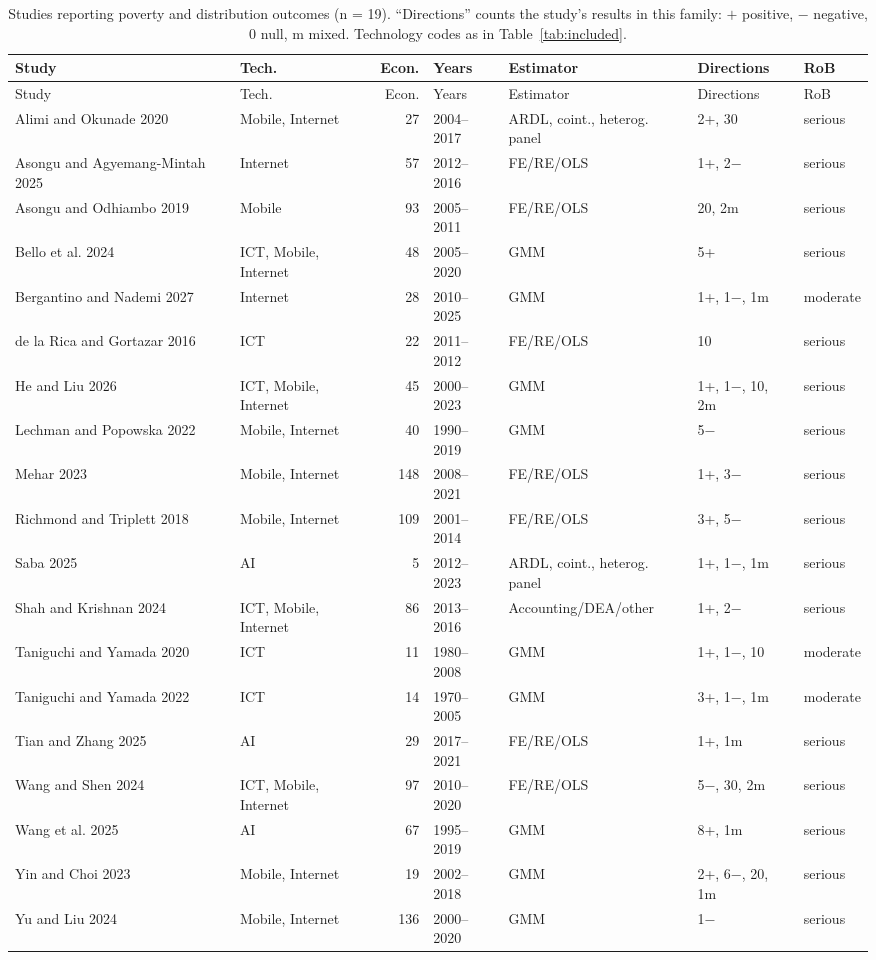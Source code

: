 {\scriptsize\setlength{\tabcolsep}{3pt}
\begin{longtable}{@{}p{3.1cm} p{1.9cm} r l p{2.4cm} p{2.3cm} l@{}}
\caption{Studies reporting poverty and distribution outcomes (n = 19). ``Directions'' counts the study's results in this family: $+$ positive, $-$ negative, 0 null, m mixed. Technology codes as in Table~\ref{tab:included}.}\label{tab:fam4}\\
\toprule Study & Tech. & Econ. & Years & Estimator & Directions & RoB \\ \midrule \endfirsthead
\toprule Study & Tech. & Econ. & Years & Estimator & Directions & RoB \\ \midrule \endhead
\bottomrule \endfoot
Alimi and Okunade 2020 & Mobile, Internet & 27 & 2004--2017 & ARDL, coint., heterog. panel & 2+, 30 & serious \\
Asongu and Agyemang-Mintah 2025 & Internet & 57 & 2012--2016 & FE/RE/OLS & 1+, 2$-$ & serious \\
Asongu and Odhiambo 2019 & Mobile & 93 & 2005--2011 & FE/RE/OLS & 20, 2m & serious \\
Bello et al. 2024 & ICT, Mobile, Internet & 48 & 2005--2020 & GMM & 5+ & serious \\
Bergantino and Nademi 2027 & Internet & 28 & 2010--2025 & GMM & 1+, 1$-$, 1m & moderate \\
de la Rica and Gortazar 2016 & ICT & 22 & 2011--2012 & FE/RE/OLS & 10 & serious \\
He and Liu 2026 & ICT, Mobile, Internet & 45 & 2000--2023 & GMM & 1+, 1$-$, 10, 2m & serious \\
Lechman and Popowska 2022 & Mobile, Internet & 40 & 1990--2019 & GMM & 5$-$ & serious \\
Mehar 2023 & Mobile, Internet & 148 & 2008--2021 & FE/RE/OLS & 1+, 3$-$ & serious \\
Richmond and Triplett 2018 & Mobile, Internet & 109 & 2001--2014 & FE/RE/OLS & 3+, 5$-$ & serious \\
Saba 2025 & AI & 5 & 2012--2023 & ARDL, coint., heterog. panel & 1+, 1$-$, 1m & serious \\
Shah and Krishnan 2024 & ICT, Mobile, Internet & 86 & 2013--2016 & Accounting/DEA/other & 1+, 2$-$ & serious \\
Taniguchi and Yamada 2020 & ICT & 11 & 1980--2008 & GMM & 1+, 1$-$, 10 & moderate \\
Taniguchi and Yamada 2022 & ICT & 14 & 1970--2005 & GMM & 3+, 1$-$, 1m & moderate \\
Tian and Zhang 2025 & AI & 29 & 2017--2021 & FE/RE/OLS & 1+, 1m & serious \\
Wang and Shen 2024 & ICT, Mobile, Internet & 97 & 2010--2020 & FE/RE/OLS & 5$-$, 30, 2m & serious \\
Wang et al. 2025 & AI & 67 & 1995--2019 & GMM & 8+, 1m & serious \\
Yin and Choi 2023 & Mobile, Internet & 19 & 2002--2018 & GMM & 2+, 6$-$, 20, 1m & serious \\
Yu and Liu 2024 & Mobile, Internet & 136 & 2000--2020 & GMM & 1$-$ & serious \\
\end{longtable}
}

